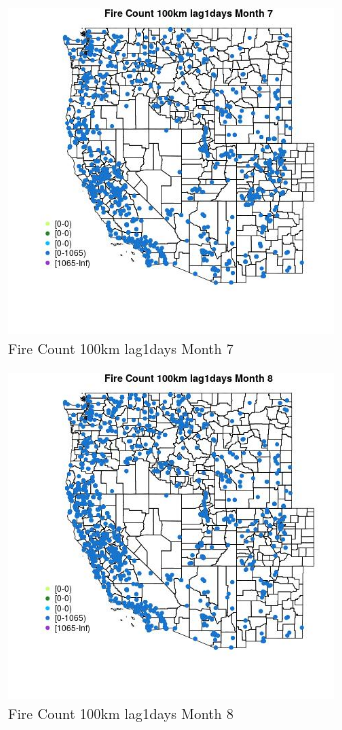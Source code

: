 \begin{figure} 
\centering  
\includegraphics[width=0.77\textwidth]{Code_Outputs/Report_ML_input_PM25_Step4_part_f_de_duplicated_aves_prioritize_24hr_obswNAs_MapObsMo7Fire_Count_100km_lag1days.jpg} 
\caption{\label{fig:Report_ML_input_PM25_Step4_part_f_de_duplicated_aves_prioritize_24hr_obswNAsMapObsMo7Fire_Count_100km_lag1days}Fire Count 100km lag1days Month 7} 
\end{figure} 
 

\begin{figure} 
\centering  
\includegraphics[width=0.77\textwidth]{Code_Outputs/Report_ML_input_PM25_Step4_part_f_de_duplicated_aves_prioritize_24hr_obswNAs_MapObsMo8Fire_Count_100km_lag1days.jpg} 
\caption{\label{fig:Report_ML_input_PM25_Step4_part_f_de_duplicated_aves_prioritize_24hr_obswNAsMapObsMo8Fire_Count_100km_lag1days}Fire Count 100km lag1days Month 8} 
\end{figure} 
 

